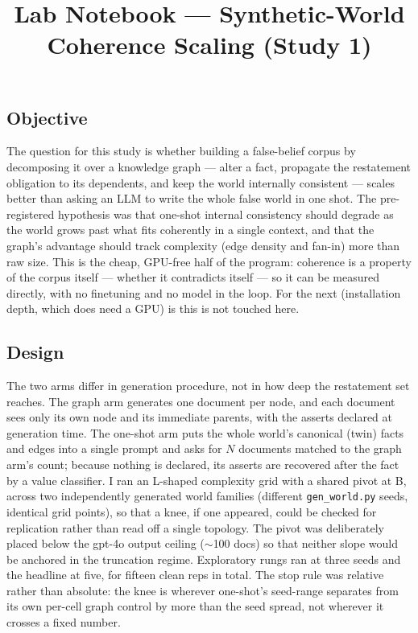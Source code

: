 \documentclass[11pt]{article}
\title{\vspace{-2.5em}\textbf{Lab Notebook --- Synthetic-World Coherence Scaling (Study 1)}}
\author{}
\date{}
\newcommand{\code}[1]{\texttt{\small #1}}
\begin{document}
\maketitle
\vspace{-3em}
\hrulefill



\subsection*{Objective}
The question for this study is whether building a false-belief corpus by decomposing it over a
knowledge graph --- alter a fact, propagate the restatement obligation to its dependents, and
keep the world internally consistent --- scales better than asking an LLM to write the whole
false world in one shot. The pre-registered hypothesis was that one-shot internal consistency
should degrade as the world grows past what fits coherently in a single context, and that the
graph's advantage should track complexity (edge density and fan-in) more than raw size. This is
the cheap, GPU-free half of the program: coherence is a property of the corpus itself --- whether
it contradicts itself --- so it can be measured directly, with no finetuning and no model in the
loop. For the next (installation depth, which does need a GPU) is this
is not touched here.

\subsection*{Design}
The two arms differ in generation procedure, not in how deep the restatement set reaches. The
graph arm generates one document per node, and each document sees only its own node and its
immediate parents, with the asserts declared at generation time. The one-shot arm puts the whole
world's canonical (twin) facts and edges into a single prompt and asks for $N$ documents matched
to the graph arm's count; because nothing is declared, its asserts are recovered after the fact
by a value classifier. I ran an L-shaped complexity grid with a shared pivot at B, across two
independently generated world families (different \code{gen\_world.py} seeds, identical grid
points), so that a knee, if one appeared, could be checked for replication rather than read off a
single topology. The pivot was deliberately placed below the gpt-4o output ceiling
($\sim$100 docs) so that neither slope would be anchored in the truncation regime. Exploratory
rungs ran at three seeds and the headline at five, for fifteen clean reps in total. The stop rule
was relative rather than absolute: the knee is wherever one-shot's seed-range separates from its
own per-cell graph control by more than the seed spread, not wherever it crosses a fixed number.
\end{document}

